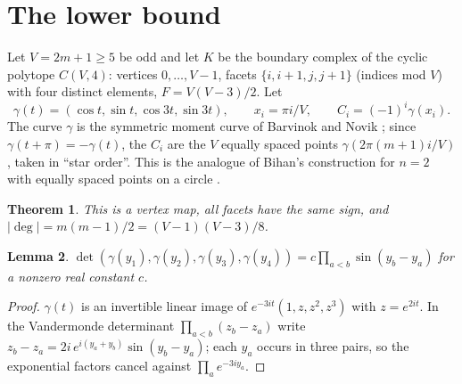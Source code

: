 \documentclass[11pt]{article}
\newtheorem{theorem}{Theorem}
\newtheorem{lemma}[theorem]{Lemma}
\theoremstyle{remark}
\begin{document}
\section{The lower bound}
Let $V=2m+1\ge5$ be odd and let $K$ be the boundary complex of the cyclic polytope $C(V,4)$: vertices $0,\dots,V-1$, facets $\{i,i+1,j,j+1\}$ (indices mod $V$) with four distinct elements, $F=V(V-3)/2$. Let
\[
\gamma(t)=(\cos t,\sin t,\cos3t,\sin3t),\qquad x_i=\pi i/V,\qquad C_i=(-1)^i\gamma(x_i).
\]
The curve $\gamma$ is the symmetric moment curve of Barvinok and Novik \cite{BN}; since $\gamma(t+\pi)=-\gamma(t)$, the $C_i$ are the $V$ equally spaced points $\gamma(2\pi(m+1)i/V)$, taken in ``star order''. This is the analogue of Bihan's construction for $n=2$ with equally spaced points on a circle \cite[Thm.~2$'$]{B}.

\begin{theorem}\label{thm:C}
This is a vertex map, all facets have the same sign, and $|\deg|=m(m-1)/2=(V-1)(V-3)/8$.
\end{theorem}

\begin{lemma}\label{lem:det}
$\det(\gamma(y_1),\gamma(y_2),\gamma(y_3),\gamma(y_4))=c\prod_{a<b}\sin(y_b-y_a)$ for a nonzero real constant $c$.
\end{lemma}
\begin{proof}
$\gamma(t)$ is an invertible linear image of $e^{-3it}(1,z,z^2,z^3)$ with $z=e^{2it}$. In the Vandermonde determinant $\prod_{a<b}(z_b-z_a)$ write $z_b-z_a=2i\,e^{i(y_a+y_b)}\sin(y_b-y_a)$; each $y_a$ occurs in three pairs, so the exponential factors cancel against $\prod_ae^{-3iy_a}$.
\end{proof}
\end{document}
